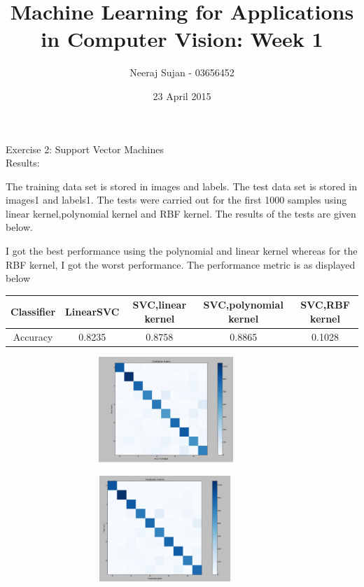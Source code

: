 \documentclass[12pt]{article}
\title{Machine Learning for Applications in Computer Vision: Week 1}
\author{Neeraj Sujan - 03656452 }
\date{23 April 2015}
\begin{document}
\maketitle

Exercise 2: Support Vector Machines
\\

Results:

The training data set is stored in images and labels. The test data set is stored in images1 and labels1. The tests were carried out for the first 1000 samples using linear kernel,polynomial kernel and RBF kernel. The results of the tests are given below. 

I got the best performance using the polynomial and linear kernel whereas for the RBF kernel, I got the worst performance. The performance metric is as displayed below \\

\begin{table}[h]
\centering
\begin{tabular}{|c|c|c|c|c|}
\hline 
Classifier & LinearSVC & SVC,linear kernel & SVC,polynomial kernel & SVC,RBF kernel \\ 
\hline 
Accuracy & 0.8235 & 0.8758 & 0.8865 & 0.1028 \\ 
\hline 
\end{tabular} 
\end{table}

\begin{figure}[h]
\centering
\includegraphics[width=10cm, height=4cm]{1}
\end{figure}

\begin{figure}[h]
\centering
\includegraphics[width=10cm, height=4cm]{2}
\end{figure}
\end{document}
